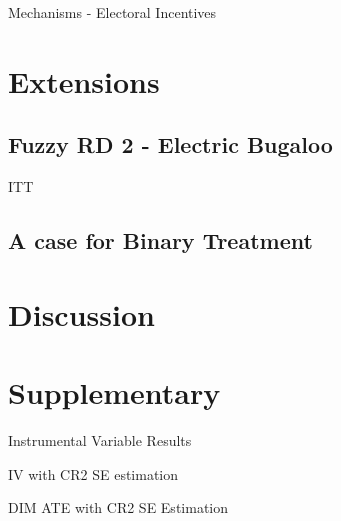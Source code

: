 \documentclass{scrartcl}
\begin{document}
\begin{table}[ht!]
  \begin{center}
    \scalebox{0.75}{
      
    }
    \caption{Mechanisms - Electoral Incentives}
    \label{table:mechanisms}
  \end{center}
\end{table}



\section{Extensions} \label{extensions}

\subsection{Fuzzy RD 2 - Electric Bugaloo}

ITT

\subsection{A case for Binary Treatment}


\section{Discussion}

\clearpage
\section{Supplementary}

\begin{table}[h!]
  \begin{center}
    \scalebox{0.75}{
      
    }
    \caption{Instrumental Variable Results}
    \label{table:iv_full}
  \end{center}
\end{table}

\begin{table}[h!]
  \begin{center}
    \scalebox{0.75}{
      
    }
    \caption{IV with CR2 SE estimation}
    \label{table:iv_cr2}
  \end{center}
\end{table}

\begin{table}[h!]
  \begin{center}
    \scalebox{0.75}{
      
    }
    \caption{DIM ATE with CR2 SE Estimation}
    \label{table:dim_cr2}
  \end{center}
\end{table}
\end{document}
